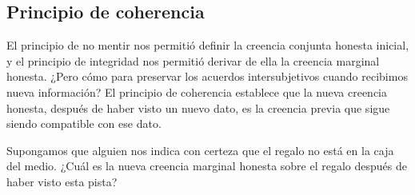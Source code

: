 \documentclass[a4paper,11pt]{book}
\theoremstyle{definition}
\begin{document}
\subsection{Principio de coherencia} \label{sec:principio_choerencia} %

El principio de no mentir nos permitió definir la creencia conjunta honesta inicial, y el principio de integridad nos permitió derivar de ella la creencia marginal honesta.
%
¿Pero cómo para preservar los acuerdos intersubjetivos cuando recibimos nueva información?
%
El principio de coherencia establece que la nueva creencia honesta, después de haber visto un nuevo dato, es la creencia previa que sigue siendo compatible con ese dato.


Supongamos que alguien nos indica con certeza que el regalo no está en la caja del medio.
%
¿Cuál es la nueva creencia marginal honesta sobre el regalo después de haber visto esta pista?


\begin{figure}[ht!]
\centering
{}
\end{figure}

%
%
\end{document}
